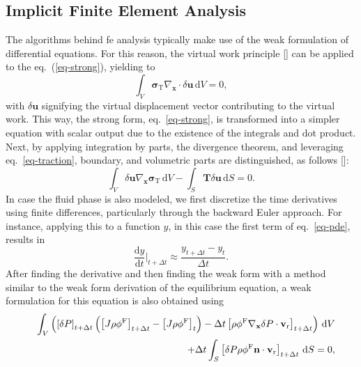 \documentclass[12pt,a4paper]{report}
\begin{document}
\subsection{Implicit Finite Element Analysis}
%
The algorithms behind \ac{fe} analysis typically make use of the weak formulation of differential equations. For this reason, the virtual work principle [\cite{antman1979}] can be applied to the eq.~(\ref{eq-strong}), yielding to
%
\begin{equation}\label{eq-weak-alt}
    \int_V \boldsymbol{\sigma}_{\mathrm{T}} \nabla_\mathbf{x} \cdot \delta \mathbf{u} \, \mathrm{d}V = 0,
\end{equation}
%
with $\delta \mathbf{u}$ signifying the virtual displacement vector contributing to the virtual work. This way, the strong form, eq.~\ref{eq-strong}, is transformed into a simpler equation with scalar output due to the existence of the integrals and dot product. Next, by applying integration by parts, the divergence theorem, and leveraging eq.~\ref{eq-traction}, boundary, and volumetric parts are distinguished, as follows [\cite{gerhard-book,belytschko2014}]:
%
\begin{equation}
    \int_V \delta \mathbf{u} \nabla_\mathbf{x} \boldsymbol{\sigma}_{\mathrm{T}} \, \mathrm{d}V - \int_S \mathbf{T} \delta \mathbf{u} \, \mathrm{d}S = 0.
\label{eq-alt-dode}
\end{equation}
%
In case the fluid phase is also modeled, we first discretize the time derivatives using finite differences, particularly through the backward Euler approach. For instance, applying this to a function $y$, in this case the first term of eq.~\ref{eq-pde}, results in
%
\begin{equation}
    \frac{\mathrm{d}y}{\mathrm{d}t} \bigg|_{t+\Delta t} \approx \frac{y_{t+\Delta t} - y_t}{\Delta t}.
\end{equation}
%
After finding the derivative and then finding the weak form with a method similar to the weak form derivation of the equilibrium equation, a weak formulation for this equation is also obtained using
%
\begin{eqnarray}
    & & \int_V \left( \left[ \delta P \right]_{t+\Delta t} \left( \left[ J \rho \phi^{\rm F} \right]_{t+\Delta t} - \left[ J \rho \phi^{\rm F} \right]_{t} \right) - \Delta t \left[ \rho \phi^{\rm F} \nabla_{\mathbf{x}} \delta P \cdot \mathbf{v}_{\rm r} \right]_{t+\Delta t} \right) \, \mathrm{d}V \nonumber \\
    & & + \Delta t \int_S \left[ \delta P \rho \phi^{\rm F} \mathbf{n} \cdot \mathbf{v}_{\rm r} \right]_{t+\Delta t} \, \mathrm{d}S = 0,\label{eq-fluid}
\end{eqnarray}
\end{document}
